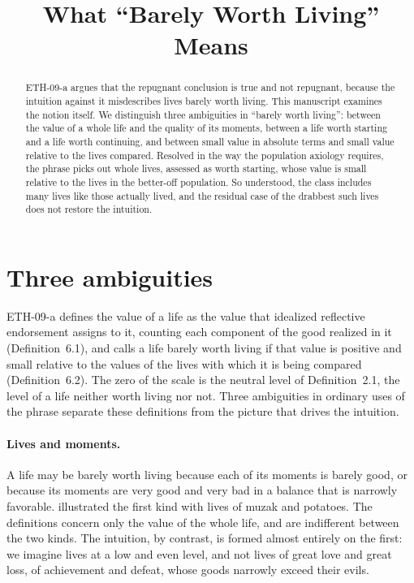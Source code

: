 \documentclass{situationist-preprint}
\title{What \enquote{Barely Worth Living} Means}
\begin{document}
\maketitle

\begin{abstract}
ETH-09-a argues that the repugnant conclusion is true and not repugnant, because the intuition against it misdescribes lives barely worth living. This manuscript examines the notion itself. We distinguish three ambiguities in \enquote{barely worth living}: between the value of a whole life and the quality of its moments, between a life worth starting and a life worth continuing, and between small value in absolute terms and small value relative to the lives compared. Resolved in the way the population axiology requires, the phrase picks out whole lives, assessed as worth starting, whose value is small relative to the lives in the better-off population. So understood, the class includes many lives like those actually lived, and the residual case of the drabbest such lives does not restore the intuition.
\end{abstract}

\section{Three ambiguities}

ETH-09-a defines the value of a life as the value that idealized reflective endorsement assigns to it, counting each component of the good realized in it (Definition~6.1), and calls a life barely worth living if that value is positive and small relative to the values of the lives with which it is being compared (Definition~6.2). The zero of the scale is the neutral level of Definition~2.1, the level of a life neither worth living nor not. Three ambiguities in ordinary uses of the phrase separate these definitions from the picture that drives the intuition.

\paragraph{Lives and moments.} A life may be barely worth living because each of its moments is barely good, or because its moments are very good and very bad in a balance that is narrowly favorable. \citet{Parfit1986} illustrated the first kind with lives of muzak and potatoes. The definitions concern only the value of the whole life, and are indifferent between the two kinds. The intuition, by contrast, is formed almost entirely on the first: we imagine lives at a low and even level, and not lives of great love and great loss, of achievement and defeat, whose goods narrowly exceed their evils.
\end{document}
